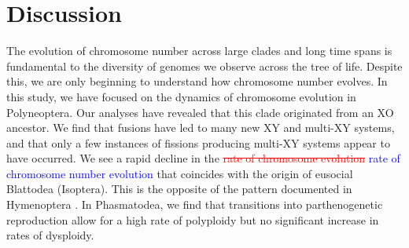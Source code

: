 \documentclass[]{rsos}%
\begin{document}
\section{Discussion}

The evolution of chromosome number across large clades and long time spans is fundamental to the diversity of genomes we observe across the tree of life.
Despite this, we are only beginning to understand how chromosome number evolves.
In this study, we have focused on the dynamics of chromosome evolution in Polyneoptera. 
Our analyses have revealed that this clade originated from an XO ancestor. 
We find that fusions have led to many new XY and multi-XY systems, and that only a few instances of fissions producing multi-XY systems appear to have occurred.
We see a rapid decline in the \textcolor{red}{\st{rate of chromosome evolution}} \textcolor{blue}{rate of chromosome number evolution} that coincides with the origin of eusocial Blattodea (Isoptera).
This is the opposite of the pattern documented in Hymenoptera \cite{ross2015}.
In Phasmatodea, we find that transitions into parthenogenetic reproduction allow for a high rate of polyploidy but no significant increase in rates of dysploidy.
\end{document}
